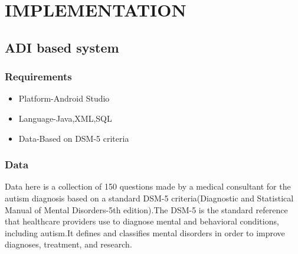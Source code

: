  

\chapter{IMPLEMENTATION }
\section{ADI based system}
\subsection{Requirements}
\begin{itemize}
  \item Platform-Android Studio
  \item Language-Java,XML,SQL
  \item Data-Based on DSM-5 criteria
\end{itemize}

\subsection{Data}

Data here is a collection of 150 questions made by a medical consultant for the autism diagnosis based on a standard DSM-5 criteria(Diagnostic and Statistical Manual of Mental Disorders-5th edition).The DSM-5 is the standard reference that healthcare providers use to diagnose  mental  and  behavioral  conditions,  including  autism.It defines and classifies mental disorders in order to improve diagnoses, treatment, and research.
